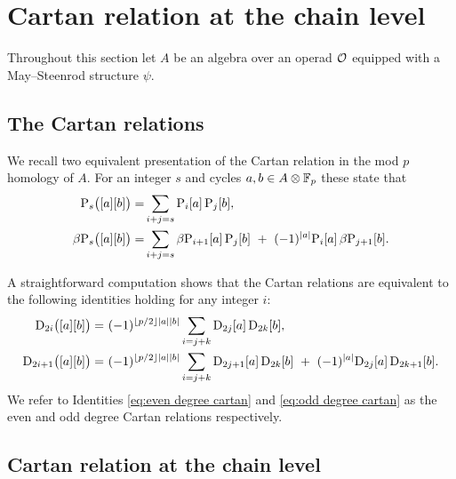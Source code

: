 
\section{Cartan relation at the chain level}\label{s:cartan}

Throughout this section let $A$ be an algebra over an operad $\mathcal{O}$ equipped with a May--Steenrod structure $\psi$.

\subsection{The Cartan relations}

We recall two equivalent presentation of the Cartan relation in the mod $p$ homology of $A$.
For an integer $s$ and cycles $a, b \in A \otimes {\mathbb{F}_p}$ these state that
\begin{align*}
	\mathrm{P}_s\big([a][b]\big) =&
	\sum_{i+j=s} \mathrm{P}_i[a] \, \mathrm{P}_j[b], \\
	\beta\mathrm{P}_s\big([a][b]\big) =&
	\sum_{i+j=s} \beta\mathrm{P}_{i+1}[a] \, \mathrm{P}_j[b] \ +\ (-1)^{\lvert a\rvert} \mathrm{P}_i[a] \, \beta\mathrm{P}_{j+1}[b].
\end{align*}

A straightforward computation shows that the Cartan relations are equivalent to the following identities holding for any integer $i$:
\begin{align}
	\label{eq:even degree cartan}
	\mathrm{D}_{2i}\big([a][b]\big) =\ &
	(-1)^{\lfloor p/2\rfloor\lvert a\rvert\lvert b\rvert} \sum_{i=j+k} \mathrm{D}_{2j}[a] \, \mathrm{D}_{2k}[b], \\
	\label{eq:odd degree cartan}
	\mathrm{D}_{2i+1}\big([a][b]\big) =\ &
	(-1)^{\lfloor p/2\rfloor\lvert a\rvert\lvert b\rvert} \sum_{i=j+k} \mathrm{D}_{2j+1}[a] \, \mathrm{D}_{2k}[b] \ +\ (-1)^{\lvert a\rvert}\mathrm{D}_{2j}[a] \, \mathrm{D}_{2k+1}[b].
\end{align}
We refer to Identities \eqref{eq:even degree cartan} and \eqref{eq:odd degree cartan} as the even and odd degree Cartan relations respectively.


\subsection{Cartan relation at the chain level}

